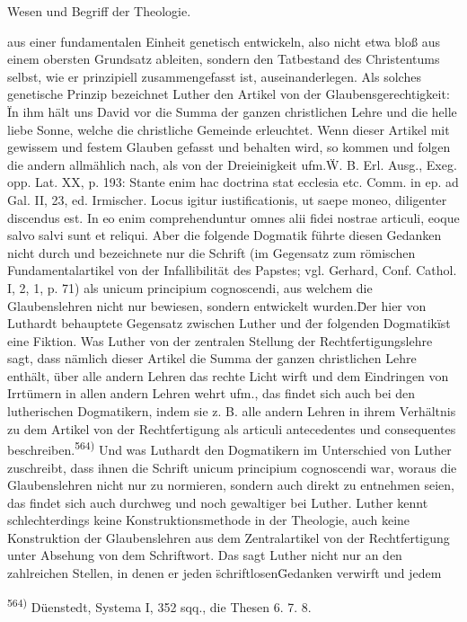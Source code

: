  \hfill Wesen und Begriff der Theologie.\par aus einer fundamentalen Einheit genetisch entwickeln, also nicht etwa bloß aus einem obersten Grundsatz ableiten, sondern den Tatbestand des Christentums selbst, wie er prinzipiell zusammengefasst ist, auseinanderlegen. Als solches genetische Prinzip bezeichnet Luther den Artikel von der Glaubensgerechtigkeit: \"In ihm hält uns David vor die Summa der ganzen christlichen Lehre und die helle liebe Sonne, welche die christliche Gemeinde erleuchtet. Wenn dieser Artikel mit gewissem und festem Glauben gefasst und behalten wird, so kommen und folgen die andern allmählich nach, als von der Dreieinigkeit ufm.\" W. B. Erl. Ausg., Exeg. opp. Lat. XX, p. 193: Stante enim hac doctrina stat ecclesia etc. Comm. in ep. ad Gal. II, 23, ed. Irmischer. Locus igitur iustificationis, ut saepe moneo, diligenter discendus est. In eo enim comprehenduntur omnes alii fidei nostrae articuli, eoque salvo salvi sunt et reliqui. Aber die folgende Dogmatik führte diesen Gedanken nicht durch und bezeichnete nur die Schrift (im Gegensatz zum römischen Fundamentalartikel von der Infallibilität des Papstes; vgl. Gerhard, Conf. Cathol. I, 2, 1, p. 71) als unicum principium cognoscendi, aus welchem die Glaubenslehren nicht nur bewiesen, sondern entwickelt wurden.\" Der hier von Luthardt behauptete Gegensatz zwischen Luther und \"der folgenden Dogmatik\" ist eine Fiktion. Was Luther von der zentralen Stellung der Rechtfertigungslehre sagt, dass nämlich dieser Artikel die Summa der ganzen christlichen Lehre enthält, über alle andern Lehren das rechte Licht wirft und dem Eindringen von Irrtümern in allen andern Lehren wehrt ufm., das findet sich auch bei den lutherischen Dogmatikern, indem sie z. B. alle andern Lehren in ihrem Verhältnis zu dem Artikel von der Rechtfertigung als articuli antecedentes und consequentes beschreiben.\textsuperscript{564)} Und was Luthardt den Dogmatikern im Unterschied von Luther zuschreibt, dass ihnen die Schrift unicum principium cognoscendi war, woraus die Glaubenslehren nicht nur zu normieren, sondern auch direkt zu entnehmen seien, das findet sich auch durchweg und noch gewaltiger bei Luther. Luther kennt schlechterdings keine Konstruktionsmethode in der Theologie, auch keine Konstruktion der Glaubenslehren aus dem Zentralartikel von der Rechtfertigung unter Absehung von dem Schriftwort. Das sagt Luther nicht nur an den zahlreichen Stellen, in denen er jeden \"schriftlosen\" Gedanken verwirft und jedem\par\vspace{\baselineskip}\noindent \textsuperscript{564)} Düenstedt, Systema I, 352 sqq., die Thesen 6. 7. 8.